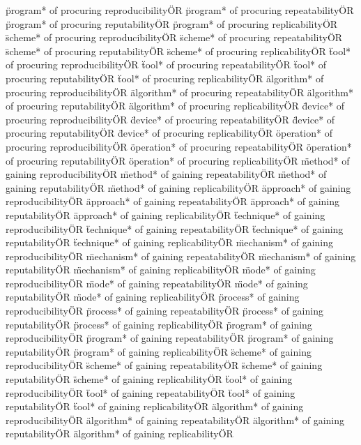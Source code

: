 \documentclass[
10pt, %
a4paper, %
oneside, %
headinclude,footinclude, %
BCOR5mm, %
]{scrartcl}
\begin{document}
\"program* of procuring reproducibility\" OR \"program* of procuring repeatability\" OR \"program* of procuring reputability\" OR \"program* of procuring replicability\" OR 
\"scheme* of procuring reproducibility\" OR \"scheme* of procuring repeatability\" OR \"scheme* of procuring reputability\" OR \"scheme* of procuring replicability\" OR 
\"tool* of procuring reproducibility\" OR \"tool* of procuring repeatability\" OR \"tool* of procuring reputability\" OR \"tool* of procuring replicability\" OR 
\"algorithm* of procuring reproducibility\" OR \"algorithm* of procuring repeatability\" OR \"algorithm* of procuring reputability\" OR \"algorithm* of procuring replicability\" OR 
\"device* of procuring reproducibility\" OR \"device* of procuring repeatability\" OR \"device* of procuring reputability\" OR \"device* of procuring replicability\" OR 
\"operation* of procuring reproducibility\" OR \"operation* of procuring repeatability\" OR \"operation* of procuring reputability\" OR \"operation* of procuring replicability\" OR 
\"method* of gaining reproducibility\" OR \"method* of gaining repeatability\" OR \"method* of gaining reputability\" OR \"method* of gaining replicability\" OR 
\"approach* of gaining reproducibility\" OR \"approach* of gaining repeatability\" OR \"approach* of gaining reputability\" OR \"approach* of gaining replicability\" OR 
\"technique* of gaining reproducibility\" OR \"technique* of gaining repeatability\" OR \"technique* of gaining reputability\" OR \"technique* of gaining replicability\" OR 
\"mechanism* of gaining reproducibility\" OR \"mechanism* of gaining repeatability\" OR \"mechanism* of gaining reputability\" OR \"mechanism* of gaining replicability\" OR 
\"mode* of gaining reproducibility\" OR \"mode* of gaining repeatability\" OR \"mode* of gaining reputability\" OR \"mode* of gaining replicability\" OR 
\"process* of gaining reproducibility\" OR \"process* of gaining repeatability\" OR \"process* of gaining reputability\" OR \"process* of gaining replicability\" OR 
\"program* of gaining reproducibility\" OR \"program* of gaining repeatability\" OR \"program* of gaining reputability\" OR \"program* of gaining replicability\" OR 
\"scheme* of gaining reproducibility\" OR \"scheme* of gaining repeatability\" OR \"scheme* of gaining reputability\" OR \"scheme* of gaining replicability\" OR 
\"tool* of gaining reproducibility\" OR \"tool* of gaining repeatability\" OR \"tool* of gaining reputability\" OR \"tool* of gaining replicability\" OR 
\"algorithm* of gaining reproducibility\" OR \"algorithm* of gaining repeatability\" OR \"algorithm* of gaining reputability\" OR \"algorithm* of gaining replicability\" OR 
\end{document}
